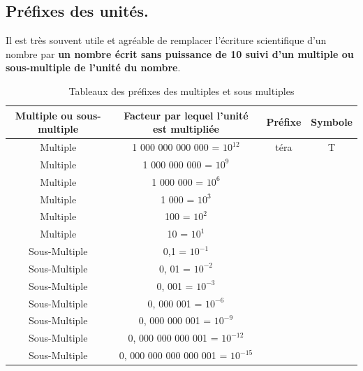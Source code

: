 

\subsection{Préfixes des unités.}
Il est très souvent utile et agréable de remplacer l’écriture scientifique d’un nombre par \textbf{un nombre écrit sans puissance de 10 suivi d'un multiple ou sous-multiple de l'unité du nombre}.
\begin{table}[!h]
    \centering
    \begin{tabularx}{\linewidth}{|c|c|c|c|}
    \hline
    Multiple ou sous-multiple & Facteur par lequel l'unité est multipliée & Préfixe & Symbole \\ 
    \hline 
    Multiple & 1 000 000 000 000 = $10^{12}$ & téra & T \\
    \hline
    Multiple & 1 000 000 000 = $10^{9}$ &  & \\
    \hline
    Multiple & 1 000 000 = $10^{6}$ &  &  \\
    \hline
    Multiple & 1 000 = $10^{3}$ &  & \\
    \hline
    Multiple & 100 = $10^{2}$ &  &  \\
    \hline
    Multiple & 10 = $10^{1}$ &  &  \\
    \hline
    Sous-Multiple & 0,1 = $10^{-1}$ &  & \\
    \hline
    Sous-Multiple & 0, 01 = $10^{-2}$ &  & \\
    \hline
    Sous-Multiple & 0, 001 = $10^{-3}$ &  & \\
    \hline
    Sous-Multiple & 0, 000 001 = $10^{-6}$ & &  \\
    \hline
    Sous-Multiple & 0, 000 000 001 = $10^{-9}$ &  & \\
    \hline
    Sous-Multiple & 0, 000 000 000 001 = $10^{-12}$ &  & \\
    \hline
    Sous-Multiple & 0, 000 000 000 000 001 = $10^{-15}$ &  & \\
    \hline
    \end{tabularx}
    
    \caption{Tableaux des préfixes des multiples et sous multiples}
    \label{tab:chap1_multiples}
\end{table}

